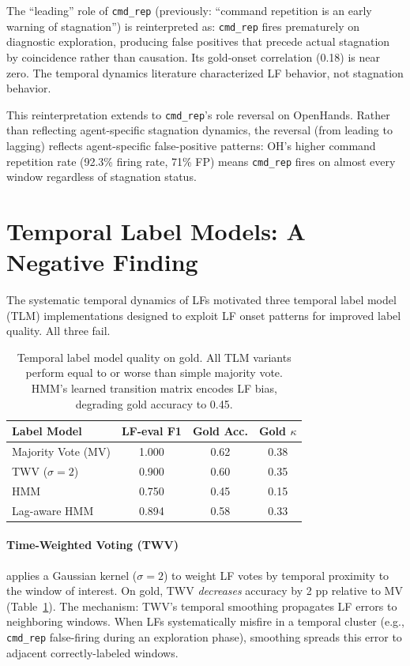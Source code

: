 \documentclass[11pt]{article}
\begin{document}
The ``leading'' role of \texttt{cmd\_rep} (previously: ``command repetition is an early warning of stagnation'') is reinterpreted as: \texttt{cmd\_rep} fires prematurely on diagnostic exploration, producing false positives that precede actual stagnation by coincidence rather than causation. Its gold-onset correlation (0.18) is near zero. The temporal dynamics literature characterized LF behavior, not stagnation behavior.

This reinterpretation extends to \texttt{cmd\_rep}'s role reversal on OpenHands. Rather than reflecting agent-specific stagnation dynamics, the reversal (from leading to lagging) reflects agent-specific false-positive patterns: OH's higher command repetition rate (92.3\% firing rate, 71\% FP) means \texttt{cmd\_rep} fires on almost every window regardless of stagnation status.

\section{Temporal Label Models: A Negative Finding}
\label{sec:tlm}

The systematic temporal dynamics of LFs motivated three temporal label model (TLM) implementations designed to exploit LF onset patterns for improved label quality. All three fail.

\begin{table}[t]
\centering
\small
\begin{tabular}{lccc}
\toprule
\textbf{Label Model} & \textbf{LF-eval F1} & \textbf{Gold Acc.} & \textbf{Gold $\kappa$} \\
\midrule
Majority Vote (MV) & 1.000 & 0.62 & 0.38 \\
TWV ($\sigma{=}2$)  & 0.900 & 0.60 & 0.35 \\
HMM                 & 0.750 & 0.45 & 0.15 \\
Lag-aware HMM       & 0.894 & 0.58 & 0.33 \\
\bottomrule
\end{tabular}
\caption{Temporal label model quality on gold. All TLM variants perform equal to or worse than simple majority vote. HMM's learned transition matrix encodes LF bias, degrading gold accuracy to 0.45.}
\label{tab:tlm}
\end{table}

\paragraph{Time-Weighted Voting (TWV)} applies a Gaussian kernel ($\sigma{=}2$) to weight LF votes by temporal proximity to the window of interest. On gold, TWV \emph{decreases} accuracy by 2 pp relative to MV (Table~\ref{tab:tlm}). The mechanism: TWV's temporal smoothing propagates LF errors to neighboring windows. When LFs systematically misfire in a temporal cluster (e.g., \texttt{cmd\_rep} false-firing during an exploration phase), smoothing spreads this error to adjacent correctly-labeled windows.
\end{document}
